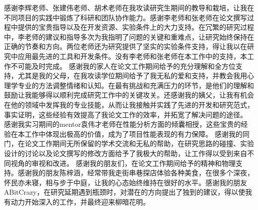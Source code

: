 
\begin{thanks*}
感谢李辉老师、张建伟老师、胡术老师在我攻读研究生期间的教导和栽培，让我在不同项目的实践中锻炼了科研和团队协作能力。感谢李老师和张老师在论文撰写过程中提供的宝贵指导以及在开发资源、实验条件上的大力支持。在冗繁的研究过程中，李老师的建议和指导多次为我指明了问题的关键和重难点，让研究始终保持在正确的节奏和方向。两位老师还为研究提供了坚实的实验条件支持，得让我以在研究中应用最先进的工具和开发条件。没有李老师和张老师在本工作中的支持，本工作不可能及时完成。
感谢我的家人在论文工作期间给予的充分理解和全方位支持，尤其是我的父母，在我攻读学位期间给予了我无私的爱和支持，并教会我用心理学专业的方法调整情绪和认知。在最有挑战和充满压力的环节，是他们的理解和鼓励让我能够得以顺利完成研究工作中的关键攻关。还感谢我的姨父，让我有机会在他的领域中发挥我的专业技能，从而让我接触并实践了先进的开发和研究范式，事实证明，这些经验有效提高了我论文工作的效率，并拓宽了解决问题的途径。
感谢我实习期间的mentor袁伟才老师在性能分析方面的倾囊相授，这些宝贵的经验在本工作中体现出极高的价值，成为了项目性能表现的有力保障。
感谢我的同门，在论文工作期间无所保留的学术交流和无私的帮助，在研究思路的碰撞、实验设计的讨论以及论文撰写的修改方面给予了我极大的帮助，让工作得以受到来自不同视角的审视和改进。
感谢我的朋友们，在论文工作期间给予的精神和物理支持。感谢我的朋友陈梓涵，经常带我走街串巷探店体验各种美食，在很多个深夜，怀民亦未寝，相与步于中庭，让我的心态始终维持在很好的水平。感谢我的朋友ABitCrazy，在研究延期遇到瓶颈时，对潜在的方向提出了独到的建议，得以使我有动力开始深入的工作，并最终迎来柳暗花明。
\end{thanks*}